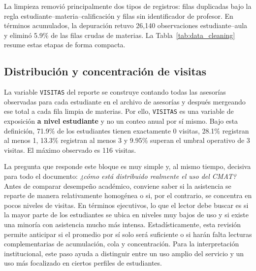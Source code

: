 \documentclass[8pt,a4paper]{article} %
\numberwithin{figure}{subsection}
\begin{document}
\begin{table}[!htbp]
    \centering
    \small
    \caption{Conteos básicos del conjunto analítico utilizado en el reporte.}
    \label{tab:data_core_counts}
    \resizebox{0.82\textwidth}{!}{}
\end{table}

La limpieza removió principalmente dos tipos de registros: filas duplicadas bajo la regla estudiante--materia--calificación y filas sin identificador de profesor. En términos acumulados, la depuración retuvo 26{,}140 observaciones estudiante--aula y eliminó 5.9\% de las filas crudas de materias. La Tabla~\ref{tab:data_cleaning} resume estas etapas de forma compacta.

\begin{table}[!htbp]
    \centering
    \scriptsize
    \caption{Resumen de los pasos de limpieza recuperables a partir del pipeline actual.}
    \label{tab:data_cleaning}
    \resizebox{\textwidth}{!}{}
\end{table}

\subsection{Distribución y concentración de visitas}
La variable \texttt{VISITAS} del reporte se construye contando todas las asesorías observadas para cada estudiante en el archivo de asesorías y después mergeando ese total a cada fila limpia de materias. Por ello, \texttt{VISITAS} es una variable de exposición \textbf{a nivel estudiante} y no un conteo anual por sí mismo. Bajo esta definición, 71.9\% de los estudiantes tienen exactamente 0 visitas, 28.1\% registran al menos 1, 13.3\% registran al menos 3 y 9.95\% superan el umbral operativo de 3 visitas. El máximo observado es 116 visitas.

La pregunta que responde este bloque es muy simple y, al mismo tiempo, decisiva para todo el documento: \emph{¿cómo está distribuido realmente el uso del CMAT?} Antes de comparar desempeño académico, conviene saber si la asistencia se reparte de manera relativamente homogénea o si, por el contrario, se concentra en pocos niveles de visitas. En términos ejecutivos, lo que el lector debe buscar es si la mayor parte de los estudiantes se ubica en niveles muy bajos de uso y si existe una minoría con asistencia mucho más intensa. Estadísticamente, esta revisión permite anticipar si el promedio por sí solo será suficiente o si harán falta lecturas complementarias de acumulación, cola y concentración. Para la interpretación institucional, este paso ayuda a distinguir entre un uso amplio del servicio y un uso más focalizado en ciertos perfiles de estudiantes.
\end{document}
